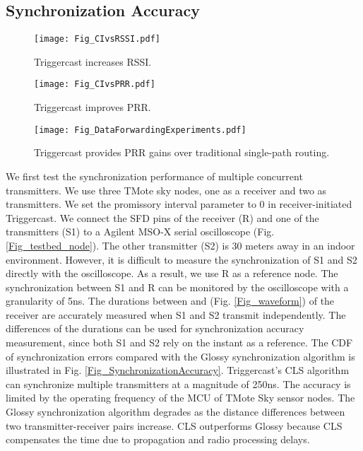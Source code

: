 \documentclass[conference]{IEEEtran}
\begin{document}
\subsection{Synchronization Accuracy}
\label{Subsec_SychronizationAccuracy}
\begin{figure*}[t]
  \centering
  \begin{minipage}[b]{0.32\textwidth}
    \centering
    \texttt{[image: Fig\_CIvsRSSI.pdf]}
    \caption{Triggercast increases RSSI.}
    \label{Fig_CIvsRSSI}\end{minipage}\hspace{0.01\linewidth}\begin{minipage}[b]{0.32\textwidth}
    \centering
    \texttt{[image: Fig\_CIvsPRR.pdf]}
    \caption{Triggercast improves PRR.}
    \label{Fig_CIvsPRR}
  \end{minipage}\hspace{0.01\linewidth}\begin{minipage}[b]{0.32\textwidth}
    \centering
    \texttt{[image: Fig\_DataForwardingExperiments.pdf]}
    \caption{Triggercast provides PRR gains over traditional single-path routing.}
    \label{Fig_DataForwardingExperiments}
  \end{minipage}\end{figure*}
\indent We first test the synchronization performance of multiple concurrent transmitters.
We use three TMote sky nodes, one as a receiver and two as transmitters.
We set the promissory interval parameter to 0 in receiver-initiated Triggercast.
We connect the SFD pins of the receiver (R) and one of the transmitters (S1) to a Agilent MSO-X serial oscilloscope (Fig. \ref{Fig_testbed_node}).
The other transmitter (S2) is 30 meters away in an indoor environment.
However, it is difficult to measure the synchronization of S1 and S2 directly with the oscilloscope.
As a result, we use R as a reference node.
The synchronization between S1 and R can be monitored by the oscilloscope with a granularity of 5ns.
The durations between  and  (Fig. \ref{Fig_waveform}) of the receiver are accurately measured when S1 and S2 transmit independently.
The differences of the durations can be used for synchronization accuracy measurement, since both S1 and S2 rely on the instant  as a reference.
The CDF of synchronization errors compared with the Glossy synchronization algorithm is illustrated in Fig. \ref{Fig_SynchronizationAccuracy}.
Triggercast's CLS algorithm can synchronize multiple transmitters at a magnitude of 250ns.
The accuracy is limited by the operating frequency of the MCU of TMote Sky sensor nodes.
The Glossy synchronization algorithm degrades as the distance differences between two transmitter-receiver pairs increase.
CLS outperforms Glossy because CLS compensates the time due to propagation and radio processing delays.
\end{document}
